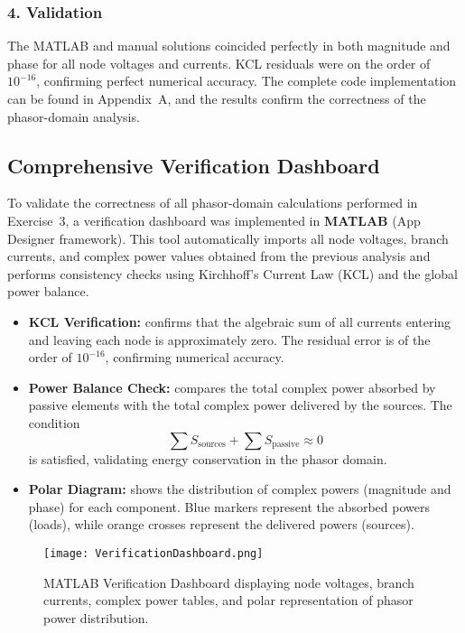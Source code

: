 \documentclass{article}
\begin{document}
\subsubsection*{4. Validation}

The MATLAB and manual solutions coincided perfectly in both magnitude and phase for all node voltages and currents.  
KCL residuals were on the order of $10^{-16}$, confirming perfect numerical accuracy.  
The complete code implementation can be found in Appendix~A, and the results confirm the correctness of the phasor-domain analysis.


\subsection*{Comprehensive Verification Dashboard}

To validate the correctness of all phasor-domain calculations performed in
Exercise~3, a verification dashboard was implemented in \textbf{MATLAB}
(App Designer framework). This tool automatically imports all node voltages,
branch currents, and complex power values obtained from the previous analysis
and performs consistency checks using Kirchhoff’s Current Law (KCL) and
the global power balance.

\begin{itemize}
    \item \textbf{KCL Verification:} confirms that the algebraic sum of all
    currents entering and leaving each node is approximately zero. The
    residual error is of the order of $10^{-16}$, confirming numerical accuracy.
    \item \textbf{Power Balance Check:} compares the total complex power
    absorbed by passive elements with the total complex power delivered by the
    sources. The condition
    \[
    \sum S_{\text{sources}} + \sum S_{\text{passive}} \approx 0
    \]
    is satisfied, validating energy conservation in the phasor domain.
    \item \textbf{Polar Diagram:} shows the distribution of complex powers
    (magnitude and phase) for each component. Blue markers represent the
    absorbed powers (loads), while orange crosses represent the delivered powers
    (sources).
\end{itemize}

\begin{figure}[H]
    \centering
    \texttt{[image: VerificationDashboard.png]}
    \caption{MATLAB Verification Dashboard displaying node voltages, branch currents,
    complex power tables, and polar representation of phasor power distribution.}
\end{figure}
\end{document}
